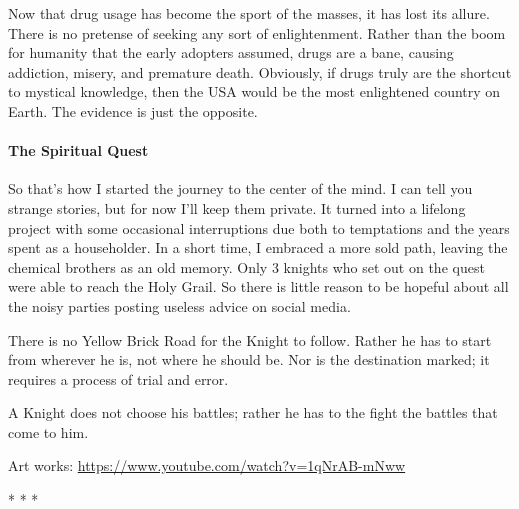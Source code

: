 Now that drug usage has become the sport of the masses, it has lost its allure. There is no pretense of seeking any sort of enlightenment. Rather than the boom for humanity that the early adopters assumed, drugs are a bane, causing addiction, misery, and premature death. Obviously, if drugs truly are the shortcut to mystical knowledge, then the USA would be the most enlightened country on Earth. The evidence is just the opposite.

\paragraph{The Spiritual Quest}
So that's how I started the journey to the center of the mind. I can tell you strange stories, but for now I'll keep them private. It turned into a lifelong project with some occasional interruptions due both to temptations and the years spent as a householder. In a short time, I embraced a more sold path, leaving the chemical brothers as an old memory. Only 3 knights who set out on the quest were able to reach the Holy Grail. So there is little reason to be hopeful about all the noisy parties posting useless advice on social media.

There is no Yellow Brick Road for the Knight to follow. Rather he has to start from wherever he is, not where he should be. Nor is the destination marked; it requires a process of trial and error.

A Knight does not choose his battles; rather he has to the fight the battles that come to him.

Art works: \url{https://www.youtube.com/watch?v=1qNrAB-mNww}


\begin{center}* * *\end{center}

